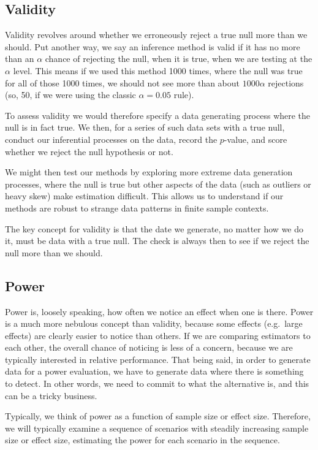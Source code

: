 \documentclass[
]{book}
\begin{document}
\subsection{Validity}\label{validity}

Validity revolves around whether we erroneously reject a true null more than we should.
Put another way, we say an inference method is valid if it has no more than an \(\alpha\) chance of rejecting the null, when it is true, when we are testing at the \(\alpha\) level.
This means if we used this method 1000 times, where the null was true for all of those 1000 times, we should not see more than about \(1000 \alpha\) rejections (so, 50, if we were using the classic \(\alpha = 0.05\) rule).

To assess validity we would therefore specify a data generating process where the null is in fact true.
We then, for a series of such data sets with a true null, conduct our inferential processes on the data, record the \(p\)-value, and score whether we reject the null hypothesis or not.

We might then test our methods by exploring more extreme data generation processes, where the null is true but other aspects of the data (such as outliers or heavy skew) make estimation difficult.
This allows us to understand if our methods are robust to strange data patterns in finite sample contexts.

The key concept for validity is that the date we generate, no matter how we do it, must be data with a true null.
The check is always then to see if we reject the null more than we should.

\subsection{Power}\label{power}

Power is, loosely speaking, how often we notice an effect when one is there.
Power is a much more nebulous concept than validity, because some effects (e.g.~large effects) are clearly easier to notice than others.
If we are comparing estimators to each other, the overall chance of noticing is less of a concern, because we are typically interested in relative performance.
That being said, in order to generate data for a power evaluation, we have to generate data where there is something to detect.
In other words, we need to commit to what the alternative is, and this can be a tricky business.

Typically, we think of power as a function of sample size or effect size. Therefore, we will typically examine a sequence of scenarios with steadily increasing sample size or effect size, estimating the power for each scenario in the sequence.
\end{document}
